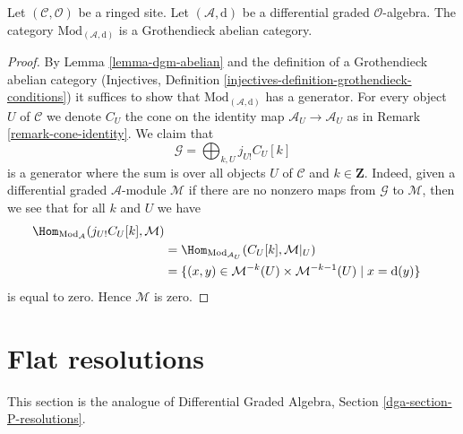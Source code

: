 \begin{lemma}
\label{lemma-dgm-grothendieck-abelian}
Let $(\mathcal{C}, \mathcal{O})$ be a ringed site.
Let $(\mathcal{A}, \text{d})$ be a differential graded $\mathcal{O}$-algebra.
The category $\text{Mod}_{(\mathcal{A}, \text{d})}$
is a Grothendieck abelian category.
\end{lemma}

\begin{proof}
By Lemma \ref{lemma-dgm-abelian} and the definition of a Grothendieck
abelian category
(Injectives, Definition \ref{injectives-definition-grothendieck-conditions})
it suffices to
show that $\text{Mod}_{(\mathcal{A}, \text{d})}$
has a generator. For every object $U$ of $\mathcal{C}$ we denote
$C_U$ the cone on the identity map $\mathcal{A}_U \to \mathcal{A}_U$
as in Remark \ref{remark-cone-identity}. We claim that
$$
\mathcal{G} = \bigoplus\nolimits_{k, U} j_{U!}C_U[k]
$$
is a generator where the sum is over all objects $U$ of $\mathcal{C}$
and $k \in \mathbf{Z}$. Indeed, given a
differential graded $\mathcal{A}$-module $\mathcal{M}$
if there are no nonzero maps from $\mathcal{G}$ to $\mathcal{M}$,
then we see that for all $k$ and $U$ we have
\begin{align*}
\Hom_{\text{Mod}_\mathcal{A}}(j_{U!}C_U[k], \mathcal{M}) \\
& =
\Hom_{\text{Mod}_{\mathcal{A}_U}}(C_U[k], \mathcal{M}|_U) \\
& =
\{(x, y) \in \mathcal{M}^{-k}(U) \times \mathcal{M}^{-k - 1}(U) \mid
x = \text{d}(y)\}
\end{align*}
is equal to zero. Hence $\mathcal{M}$ is zero.
\end{proof}











\section{Flat resolutions}
\label{Section-P-resolutions}

\noindent
This section is the analogue of
Differential Graded Algebra, Section \ref{dga-section-P-resolutions}.

